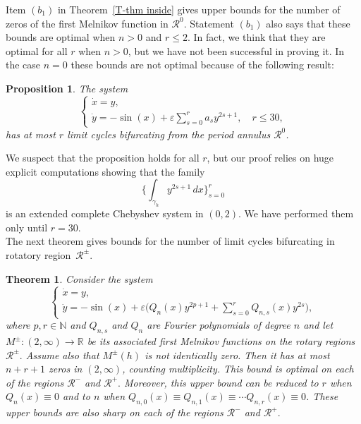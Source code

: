 \documentclass[12pt,psamsfonts]{amsart}
\newtheorem {proposition} [theorem]{Proposition}
\newtheorem{thmx}{Theorem}
\begin{document}
Item $(b_1)$ in Theorem~\ref{T-thm inside} gives upper bounds for the number of zeros of the first
Melnikov function in $\mathcal {R}^0$. Statement $(b_1)$ also says that these bounds are optimal
when $n>0$ and $r\le 2$. In fact, we think that they are optimal for all $r$ when $n>0$, but we
have not been successful in proving it. In the case $n=0$ these bounds are not optimal because of
the following result:

\begin{proposition}\label{p-nova}
The system
    \begin{equation*}
      \label{E-penduSysGen3}
           {
  \left\{\!
   \begin{array}{l}
    \dot x={y,} \\[2pt] \dot y={-\sin( x)+ {\varepsilon} \sum_{s=0}^{r}a_s y^{2s+1},\quad r\le30,}
   \end{array}
  \right.
}
     \end{equation*}
has at most $r$ limit cycles  bifurcating from the period annulus $\mathcal {R}^0$.
\end{proposition}

We suspect that the proposition holds for all $r$, but our proof relies on huge explicit
computations showing  that the family
$$\Big\{\int_{\gamma_h}y^{2s+1}\, dx\Big\}_{s=0}^{r}$$ is an extended
complete Chebyshev system in $(0,2)$. We have performed them  only until $r=30.$\\

The next theorem gives bounds for the number of limit cycles bifurcating in rotatory region~$\mathcal{R}^\pm.$

\begin{thmx}
\label{T-thm outside}
Consider the system
    \begin{equation*}
      \label{E-penduSysGen4}
           {
  \left\{\!
   \begin{array}{l}
    \dot x={y,} \\[2pt] \dot y={-\sin( x)+ {\varepsilon} \big(Q_{n}(x) y^{2p+1}+\sum_{s=0}^{r}Q_{n,s}(x)y^{2s}\big),}
   \end{array}
  \right.
}
     \end{equation*}
where $p,r\in{\mathbb{N}}$ and $Q_{n,s}$ and $Q_{n}$ are Fourier polynomials of degree $n$ and let
$M^{\pm}:(2,\infty)\longrightarrow {\mathbb{R}}$ be its associated first Melnikov functions on the rotary
regions $\mathcal{R}^\pm.$  Assume also that $M^{\pm}(h)$ is not identically zero.  Then it has at
most $n+r+1$ zeros in $(2,\infty)$, counting  multiplicity.  This bound is  optimal on each of the
regions $\mathcal{R}^-$ and $\mathcal{R}^+.$
 Moreover, this upper bound can be reduced to $r$ when
 $Q_{n}(x)\equiv0$ and to
 $n$   when $Q_{n,0}(x)\equiv
 Q_{n,1}(x)\equiv\cdots Q_{n,r}(x)\equiv0$.  These upper bounds
are also sharp on each of the regions
$\mathcal{R}^-$ and $\mathcal{R}^+.$
\end{thmx}
\end{document}
